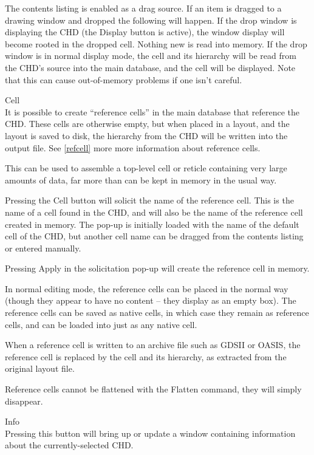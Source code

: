 \begin{description}
The contents listing is enabled as a drag source.  If an item is
dragged to a drawing window and dropped the following will happen.  If
the drop window is displaying the CHD (the {\cb Display} button is
active), the window display will become rooted in the dropped cell. 
Nothing new is read into memory.  If the drop window is in normal
display mode, the cell and its hierarchy will be read from the CHD's
source into the main database, and the cell will be displayed.  Note
that this can cause out-of-memory problems if one isn't careful.

\item{\cb Cell}\\
It is possible to create ``reference cells'' in the main database that
reference the CHD.  These cells are otherwise empty, but when placed
in a layout, and the layout is saved to disk, the hierarchy from the
CHD will be written into the output file.  See \ref{refcell} more more
information about reference cells.

This can be used to assemble a top-level cell or reticle containing
very large amounts of data, far more than can be kept in memory in the
usual way.

Pressing the {\cb Cell} button will solicit the name of the reference
cell.  This is the name of a cell found in the CHD, and will also be
the name of the reference cell created in memory.  The pop-up is
initially loaded with the name of the default cell of the CHD, but
another cell name can be dragged from the contents listing or entered
manually.

Pressing {\cb Apply} in the solicitation pop-up will create the
reference cell in memory.

In normal editing mode, the reference cells can be placed in the
normal way (though they appear to have no content -- they display as
an empty box).  The reference cells can be saved as native cells, in
which case they remain as reference cells, and can be loaded into
{\Xic} just as any native cell.

When a reference cell is written to an archive file such as GDSII or
OASIS, the reference cell is replaced by the cell and its hierarchy,
as extracted from the original layout file.

Reference cells cannot be flattened with the {\cb Flatten} command,
they will simply disappear.

\item{\cb Info}\\
Pressing this button will bring up or update a window containing
information about the currently-selected CHD.


\end{description}
